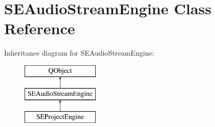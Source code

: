 \hypertarget{class_s_e_audio_stream_engine}{\section{S\+E\+Audio\+Stream\+Engine Class Reference}
\label{class_s_e_audio_stream_engine}
}
Inheritance diagram for S\+E\+Audio\+Stream\+Engine\+:\begin{figure}[H]
\begin{center}
\leavevmode
\includegraphics[height=3.000000cm]{class_s_e_audio_stream_engine}
\end{center}
\end{figure}
